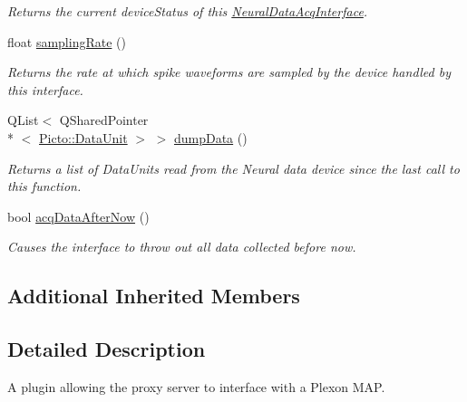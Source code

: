 \begin{DoxyCompactItemize}
\begin{DoxyCompactList}\small\item\em Returns the current device\-Status of this \hyperlink{class_neural_data_acq_interface}{Neural\-Data\-Acq\-Interface}. \end{DoxyCompactList}\item 
\hypertarget{class_plexon_plugin_a7553334b41f4e19dbbbae2f30e54569f}{float \hyperlink{class_plexon_plugin_a7553334b41f4e19dbbbae2f30e54569f}{sampling\-Rate} ()}\label{class_plexon_plugin_a7553334b41f4e19dbbbae2f30e54569f}

\begin{DoxyCompactList}\small\item\em Returns the rate at which spike waveforms are sampled by the device handled by this interface. \end{DoxyCompactList}\item 
Q\-List$<$ Q\-Shared\-Pointer\\*
$<$ \hyperlink{class_picto_1_1_data_unit}{Picto\-::\-Data\-Unit} $>$ $>$ \hyperlink{class_plexon_plugin_a4fd861a9a63521256a2cd5a97511853f}{dump\-Data} ()
\begin{DoxyCompactList}\small\item\em Returns a list of Data\-Units read from the Neural data device since the last call to this function. \end{DoxyCompactList}\item 
bool \hyperlink{class_plexon_plugin_ad1a9a2a999a14125f17016ca64a6f197}{acq\-Data\-After\-Now} ()
\begin{DoxyCompactList}\small\item\em Causes the interface to throw out all data collected before now. \end{DoxyCompactList}\end{DoxyCompactItemize}
\subsection*{Additional Inherited Members}


\subsection{Detailed Description}
A plugin allowing the proxy server to interface with a Plexon M\-A\-P. 

